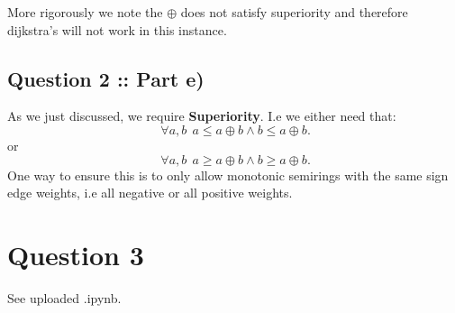 \documentclass[a4paper]{article}
\begin{document}
More rigorously we note the $\oplus$ does not satisfy superiority and therefore dijkstra's will not work
in this instance.

\subsection*{Question 2 :: Part e)}
As we just discussed, we require \textbf{Superiority}. I.e we either need that:
\[
    ~\forall a, b ~ ~ a \le a \oplus b \land b \le a \oplus b
.\]
or 
\[
~\forall a, b ~ ~ a \ge  a \oplus b \land b \ge a \oplus b
.\]
One way to ensure this is to only allow monotonic semirings with the same sign edge weights, i.e
all negative or all positive weights.




\section*{Question 3}
See uploaded .ipynb.
\end{document}
